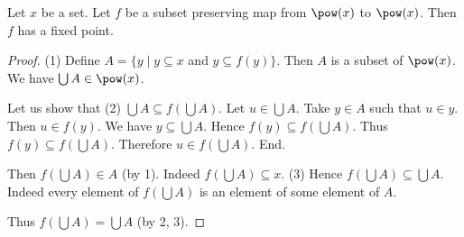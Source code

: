 \documentclass[../../set-theory/set-theory.tex]{subfiles}
\begin{document}
  \begin{forthel}
    \begin{theorem}
      Let $x$ be a set.
      Let $f$ be a subset preserving map from $\pow(x)$ to $\pow(x)$.
      Then $f$ has a fixed point.
    \end{theorem}
    \begin{proof}
      (1) Define $A = \{ y \mid y \subseteq x$ and $y \subseteq f(y) \}$.
      Then $A$ is a subset of $\pow(x)$.
      We have $\bigcup A \in \pow(x)$.

      Let us show that (2) $\bigcup A \subseteq f(\bigcup A)$.
        Let $u \in \bigcup A$.
        Take $y \in A$ such that $u \in y$.
        Then $u \in f(y)$.
        We have $y \subseteq \bigcup A$.
        Hence $f(y) \subseteq f(\bigcup A)$.
        Thus $f(y) \subseteq f(\bigcup A)$.
        Therefore $u \in f(\bigcup A)$.
      End.

      Then $f(\bigcup A) \in A$ (by 1).
      Indeed $f(\bigcup A) \subseteq x$.
      (3) Hence $f(\bigcup A) \subseteq \bigcup A$.
      Indeed every element of $f(\bigcup A)$ is an element of some element of
      $A$.

      Thus $f(\bigcup A) = \bigcup A$ (by 2, 3).
    \end{proof}
  \end{forthel}
\end{document}
